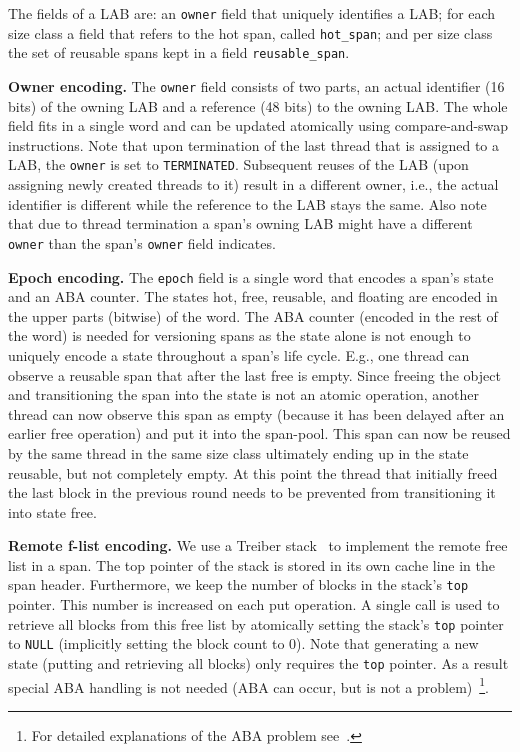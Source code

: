 \documentclass[10pt]{sigplanconf}
\newcommand{\OurSubsubsection}[1]{\smallbreak\noindent\textbf{#1}\xspace}
\newcommand{\impl}[1]{{\tt #1}\xspace}
\begin{document}
The fields of a LAB are: an \impl{owner} field that uniquely identifies a LAB;
for each size class a field that refers to the hot span, called
\impl{hot\_span}; and per size class the set of reusable spans kept in a field
\impl{reusable\_span}.

\OurSubsubsection{Owner encoding.}
The \impl{owner} field consists of two parts, an actual identifier (16 bits) of
the owning LAB and a reference (48 bits) to the owning LAB. The whole field fits
in a single word and can be updated atomically using compare-and-swap
instructions.  Note that upon termination of the last thread that is assigned to
a LAB, the \impl{owner} is set to \impl{TERMINATED}. Subsequent reuses of the
LAB (upon assigning newly created threads to it) result in a different owner,
i.e., the actual identifier is different while the reference to the LAB stays
the same. Also note that due to thread termination a span's owning LAB might
have a different \impl{owner} than the span's \impl{owner} field indicates.

\OurSubsubsection{Epoch encoding.}
The \impl{epoch} field is a single word that encodes a span's state and an ABA
counter. The states hot, free, reusable, and floating are encoded in the upper
parts (bitwise) of the word. The ABA counter (encoded in the rest of the word)
is needed for versioning spans as the state alone is not enough to uniquely
encode a state throughout a span's life cycle. E.g., one thread can observe a
reusable span that after the last free is empty. Since freeing the object and
transitioning the span into the state is not an atomic operation, another thread
can now observe this span as empty (because it has been delayed after an earlier
free operation) and put it into the span-pool. This span can now be reused by
the same thread in the same size class ultimately ending up in the state
reusable, but not completely empty. At this point the thread that initially
freed the last block in the previous round needs to be prevented from
transitioning it into state free.

\OurSubsubsection{Remote f-list encoding.}
We use a Treiber stack~\cite{Treiber86} to implement the remote free list in a
span. The top pointer of the stack is stored in its own cache line in the span
header. Furthermore, we keep the number of blocks in the stack's \impl{top}
pointer. This number is increased on each put operation. A single call is used
to retrieve all blocks from this free list by atomically setting the stack's
\impl{top} pointer to \impl{NULL} (implicitly setting the block count to 0).
Note that generating a new state (putting and retrieving all blocks) only
requires the \impl{top} pointer. As a result special ABA handling is not needed
(ABA can occur, but is not a problem)~\footnote{For detailed explanations of the
ABA problem see~\cite{Michael:IEEE04}.}.
\end{document}

